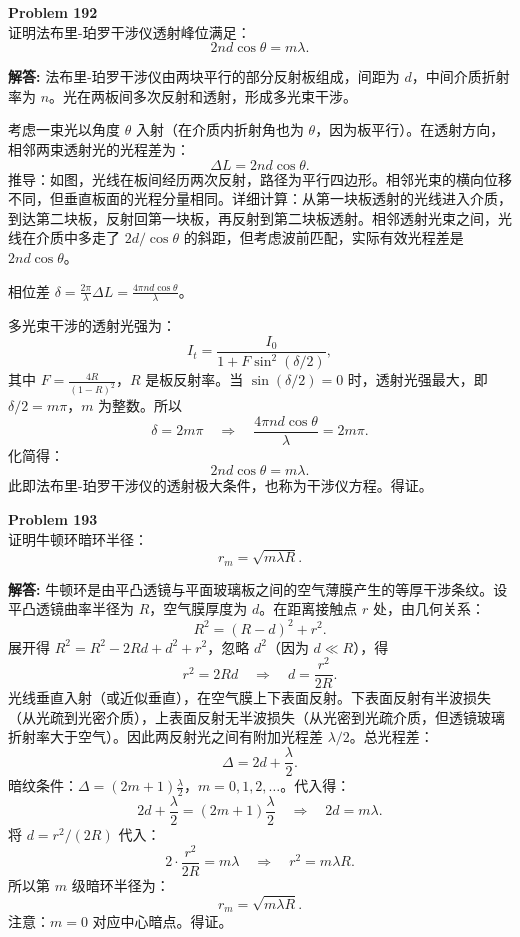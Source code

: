 \documentclass[12pt, a4paper, oneside]{ctexart}
\newenvironment{solution}{\par\noindent\textbf{解答:}\quad}{\par}
\begin{document}
\begin{mdframed}[backgroundcolor=gray!10, linewidth=0pt]
    \textbf{Problem 192} \\
    证明法布里-珀罗干涉仪透射峰位满足：
    \[
    2 n d \cos\theta = m\lambda.
    \]
\end{mdframed}
\begin{solution}
    法布里-珀罗干涉仪由两块平行的部分反射板组成，间距为 $d$，中间介质折射率为 $n$。光在两板间多次反射和透射，形成多光束干涉。

    考虑一束光以角度 $\theta$ 入射（在介质内折射角也为 $\theta$，因为板平行）。在透射方向，相邻两束透射光的光程差为：
    \[
    \Delta L = 2 n d \cos\theta.
    \]
    推导：如图，光线在板间经历两次反射，路径为平行四边形。相邻光束的横向位移不同，但垂直板面的光程分量相同。详细计算：从第一块板透射的光线进入介质，到达第二块板，反射回第一块板，再反射到第二块板透射。相邻透射光束之间，光线在介质中多走了 $2d/\cos\theta$ 的斜距，但考虑波前匹配，实际有效光程差是 $2nd\cos\theta$。

    相位差 $\delta = \frac{2\pi}{\lambda} \Delta L = \frac{4\pi n d \cos\theta}{\lambda}$。

    多光束干涉的透射光强为：
    \[
    I_t = \frac{I_0}{1 + F \sin^2(\delta/2)},
    \]
    其中 $F = \frac{4R}{(1-R)^2}$，$R$ 是板反射率。当 $\sin(\delta/2)=0$ 时，透射光强最大，即 $\delta/2 = m\pi$，$m$ 为整数。所以
    \[
    \delta = 2m\pi \quad \Rightarrow \quad \frac{4\pi n d \cos\theta}{\lambda} = 2m\pi.
    \]
    化简得：
    \[
    2 n d \cos\theta = m\lambda.
    \]
    此即法布里-珀罗干涉仪的透射极大条件，也称为干涉仪方程。得证。
\end{solution}

\begin{mdframed}[backgroundcolor=gray!10, linewidth=0pt]
    \textbf{Problem 193} \\
    证明牛顿环暗环半径：
    \[
    r_m = \sqrt{m\lambda R}.
    \]
\end{mdframed}
\begin{solution}
    牛顿环是由平凸透镜与平面玻璃板之间的空气薄膜产生的等厚干涉条纹。设平凸透镜曲率半径为 $R$，空气膜厚度为 $d$。在距离接触点 $r$ 处，由几何关系：
    \[
    R^2 = (R - d)^2 + r^2.
    \]
    展开得 $R^2 = R^2 - 2Rd + d^2 + r^2$，忽略 $d^2$（因为 $d \ll R$），得
    \[
    r^2 = 2Rd \quad \Rightarrow \quad d = \frac{r^2}{2R}.
    \]
    光线垂直入射（或近似垂直），在空气膜上下表面反射。下表面反射有半波损失（从光疏到光密介质），上表面反射无半波损失（从光密到光疏介质，但透镜玻璃折射率大于空气）。因此两反射光之间有附加光程差 $\lambda/2$。总光程差：
    \[
    \Delta = 2d + \frac{\lambda}{2}.
    \]
    暗纹条件：$\Delta = (2m+1)\frac{\lambda}{2}$，$m=0,1,2,\dots$。代入得：
    \[
    2d + \frac{\lambda}{2} = (2m+1)\frac{\lambda}{2} \quad \Rightarrow \quad 2d = m\lambda.
    \]
    将 $d = r^2/(2R)$ 代入：
    \[
    2 \cdot \frac{r^2}{2R} = m\lambda \quad \Rightarrow \quad r^2 = m\lambda R.
    \]
    所以第 $m$ 级暗环半径为：
    \[
    r_m = \sqrt{m\lambda R}.
    \]
    注意：$m=0$ 对应中心暗点。得证。
\end{solution}
\end{document}
